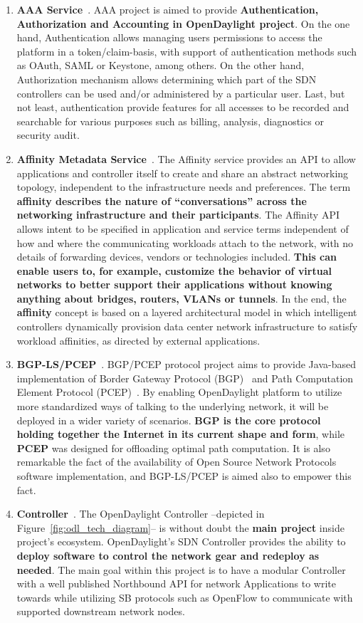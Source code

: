 \documentclass[a4paper, 12pt]{book}
\begin{document}
\begin{enumerate}
\item{\textbf{AAA Service}}~\cite{OpenDaylightWikiAAA}. AAA project is aimed to provide \textbf{Authentication, Authorization and Accounting in OpenDaylight project}. On the one hand, Authentication allows managing users permissions to access the platform in a token/claim-basis, with support of authentication methods such as OAuth, SAML or Keystone, among others. On the other hand, Authorization mechanism allows determining which part of the SDN controllers can be used and/or administered by a particular user. Last, but not least, authentication provide features for all accesses to be recorded and searchable for various purposes such as billing, analysis, diagnostics or security audit.
\item{\textbf{Affinity Metadata Service}}~\cite{OpenDaylightWikiAffinity}. The Affinity service provides an API to allow applications and controller itself to create and share an abstract networking topology, independent to the infrastructure needs and preferences. The term \textbf{affinity describes the nature of “conversations” across the networking infrastructure and their participants}. The Affinity API allows intent to be specified in application and service terms independent of how and where the communicating workloads attach to the network, with no details of forwarding devices, vendors or technologies included. \textbf{This can enable users to, for example, customize the behavior of virtual networks to better support their applications without knowing anything about bridges, routers, VLANs or tunnels}. In the end, the \textbf{affinity} concept is based on a layered architectural model in which intelligent controllers dynamically provision data center network infrastructure to satisfy workload affinities, as directed by external applications.
\item{\textbf{BGP-LS/PCEP}}~\cite{OpenDaylightWikiBGP}. BGP/PCEP protocol project aims to provide Java-based implementation of Border Gateway Protocol (BGP)~\cite{BGP} and Path Computation Element Protocol (PCEP)~\cite{PCEP}. By enabling OpenDaylight platform to utilize more standardized ways of talking to the underlying network, it will be deployed in a wider variety of scenarios. \textbf{BGP is the core protocol holding together the Internet in its current shape and form}, while \textbf{PCEP} was designed for offloading optimal path computation. It is also remarkable the fact of the availability of Open Source Network Protocols software implementation, and BGP-LS/PCEP is aimed also to empower this fact.
\item{\textbf{Controller}}~\cite{OpenDaylightWikiController}. The OpenDaylight Controller --depicted in Figure~\ref{fig:odl_tech_diagram}-- is without doubt the \textbf{main project} inside project's ecosystem. OpenDaylight's SDN Controller provides the ability to \textbf{deploy software to control the network gear and redeploy as needed}. The main goal within this project is to have a modular Controller with a well published Northbound API for network Applications to write towards while utilizing SB protocols such as OpenFlow to communicate with supported downstream network nodes.


\end{enumerate}
\end{document}
